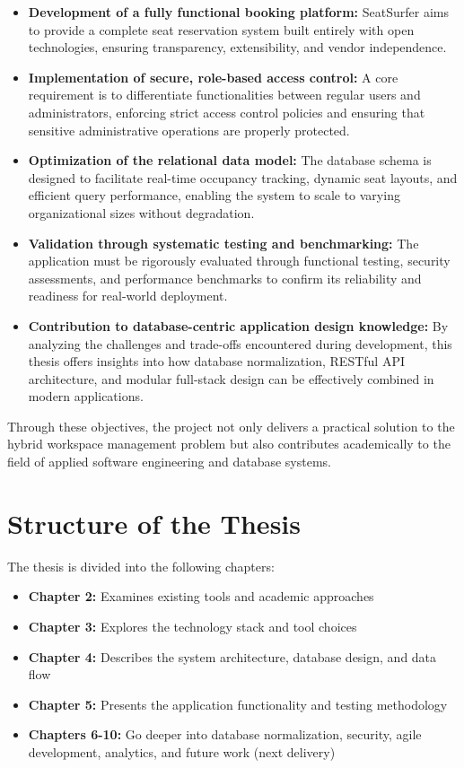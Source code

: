 \documentclass[12pt,a4paper]{report} %
\begin{document}
\begin{itemize}
    \item \textbf{Development of a fully functional booking platform:} SeatSurfer aims to provide a complete seat reservation system built entirely with open technologies, ensuring transparency, extensibility, and vendor independence.
    
    \item \textbf{Implementation of secure, role-based access control:} A core requirement is to differentiate functionalities between regular users and administrators, enforcing strict access control policies and ensuring that sensitive administrative operations are properly protected.
    
    \item \textbf{Optimization of the relational data model:} The database schema is designed to facilitate real-time occupancy tracking, dynamic seat layouts, and efficient query performance, enabling the system to scale to varying organizational sizes without degradation.
    
    \item \textbf{Validation through systematic testing and benchmarking:} The application must be rigorously evaluated through functional testing, security assessments, and performance benchmarks to confirm its reliability and readiness for real-world deployment.
    
    \item \textbf{Contribution to database-centric application design knowledge:} By analyzing the challenges and trade-offs encountered during development, this thesis offers insights into how database normalization, RESTful API architecture, and modular full-stack design can be effectively combined in modern applications.
\end{itemize}

Through these objectives, the project not only delivers a practical solution to the hybrid workspace management problem but also contributes academically to the field of applied software engineering and database systems.

\section{Structure of the Thesis}

The thesis is divided into the following chapters:
\begin{itemize}
    \item \textbf{Chapter 2:} Examines existing tools and academic approaches
    \item \textbf{Chapter 3:} Explores the technology stack and tool choices
    \item \textbf{Chapter 4:} Describes the system architecture, database design, and data flow
    \item \textbf{Chapter 5:} Presents the application functionality and testing methodology
    \item \textbf{Chapters 6-10:} Go deeper into database normalization, security, agile development, analytics, and future work (next delivery)
\end{itemize}
\end{document}
